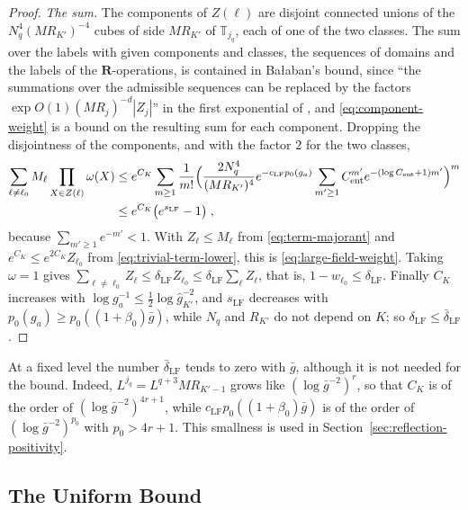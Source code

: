 \documentclass[11pt]{preprint}
\numberwithin{equation}{section}
\theoremstyle{definition}
\theoremstyle{remark}
\theoremstyle{plain}
\begin{document}
\begin{proof}
\emph{The sum.} The components of $Z(\ell)$ are disjoint connected unions of the $N_q^4(MR_{K'})^{-4}$ cubes of side $MR_{K'}$ of $\mathbb T_{j_q}$, each of one of the two classes. The sum over the labels with given components and classes, the sequences of domains and the labels of the $\mathbf R$-operations, is contained in Ba{\l}aban's bound, since ``the summations over the admissible sequences can be replaced by the factors $\exp O(1)(MR_j)^{-d}|Z_j|$'' in the first exponential of \cite[(1.79)]{BalabanLFR2} \cite[p.~383]{BalabanLFR2}, and \eqref{eq:component-weight} is a bound on the resulting sum for each component. Dropping the disjointness of the components, and with the factor $2$ for the two classes,
\begin{equation}\label{eq:pattern-sum}
\begin{split}
    \sum_{\ell \neq \ell_0}M_\ell\prod_{X \in Z(\ell)}\omega(X) &\leq e^{C_K}\sum_{m \geq 1}\frac{1}{m!}\Bigl(\frac{2N_q^4}{(MR_{K'})^4}e^{-c_{\mathrm{LF}}p_0(g_a)}\sum_{m' \geq 1}C_{\mathrm{ent}}^{m'}e^{-(\log C_{\mathrm{ent}} + 1)m'}\Bigr)^m\\
    &\leq e^{C_K}\bigl(e^{s_{\mathrm{LF}}} - 1\bigr)\;,
\end{split}
\end{equation}
because $\sum_{m' \geq 1}e^{-m'} < 1$. With $Z_\ell \leq M_\ell$ from \eqref{eq:term-majorant} and $e^{C_K} \leq e^{2C_K}Z_{\ell_0}$ from \eqref{eq:trivial-term-lower}, this is \eqref{eq:large-field-weight}. Taking $\omega = 1$ gives $\sum_{\ell \neq \ell_0}Z_\ell \leq \delta_{\mathrm{LF}}Z_{\ell_0} \leq \delta_{\mathrm{LF}}\sum_\ell Z_\ell$, that is, $1 - w_{\ell_0} \leq \delta_{\mathrm{LF}}$. Finally $C_K$ increases with $\log g_a^{-1} \leq \frac12\log\hat g_{K'}^{-2}$, and $s_{\mathrm{LF}}$ decreases with $p_0(g_a) \geq p_0((1 + \beta_0)\bar g)$, while $N_q$ and $R_{K'}$ do not depend on $K$; so $\delta_{\mathrm{LF}} \leq \bar\delta_{\mathrm{LF}}$.
\end{proof}

At a fixed level the number $\bar\delta_{\mathrm{LF}}$ tends to zero with $\bar g$, although it is not needed for the bound. Indeed, $L^{j_q} = L^{q+3}MR_{K'-1}$ grows like $(\log\bar g^{-2})^r$, so that $C_K$ is of the order of $(\log\bar g^{-2})^{4r+1}$, while $c_{\mathrm{LF}}p_0((1 + \beta_0)\bar g)$ is of the order of $(\log\bar g^{-2})^{p_0}$ with $p_0 > 4r + 1$. This smallness is used in Section~\ref{sec:reflection-positivity}.

\subsection{The Uniform Bound}\label{sec:uniform-bound}
\end{document}
